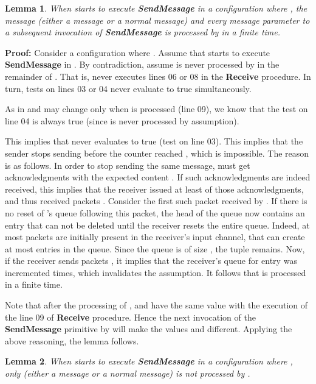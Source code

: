 \documentclass[11pt]{article}
\newtheorem{lemma}{Lemma}
\newenvironment{proof}{\noindent\textbf{Proof:}}{\hfill}
\begin{document}
\begin{lemma}\label{lem:firstabneqld}
When  starts to execute \textbf{SendMessage}  in a configuration where  , the message  (either a  message or a normal message) and every message parameter to a subsequent invocation of \textbf{SendMessage} is processed by  in a finite time.
\end{lemma}

\begin{proof}
Consider a configuration  where . Assume that  starts to execute \textbf{SendMessage}  in . By contradiction, assume  is never processed by  in the remainder of . That is,  never executes lines 06 or 08 in the \textbf{Receive} procedure. In turn, tests on lines 03 or 04 never evaluate to true simultaneously. 

As  in  and  may change only when  is processed (line 09), we know that the test on line 04 is always true (since  is never processed by assumption).

This implies that  never evaluates to true (test on line 03). This implies that the sender stops sending  before the  counter reached , which is impossible. The reason is as follows. In order to stop sending the same message,  must get  acknowledgments with the expected content . If such  acknowledgments are indeed received, this implies that the receiver issued at least  of those acknowledgments, and thus received  packets . Consider the first such packet  received by . If there is no reset of 's queue following this packet, the head of the queue now contains an entry  that can not be deleted until the receiver resets the entire queue. Indeed, at most  packets are initially present in the receiver's input channel, that can create at most  entries in the queue. Since the queue is of size , the  tuple remains. Now, if the receiver sends  packets , it implies that the receiver's queue for entry  was incremented  times, which invalidates the assumption. It follows that  is processed in a finite time.

Note that after the processing of ,  and  have the same value with the execution of the line 09 of \textbf{Receive} procedure. Hence the next invocation of the \textbf{SendMessage} primitive by  will make the values  and  different. Applying the above reasoning, the lemma follows.
\end{proof}

\begin{lemma}\label{lem:firstab=ld}
When  starts to execute \textbf{SendMessage}  in a configuration where  , only  (either a  message or a normal message) is not processed by .
\end{lemma}
\end{document}
